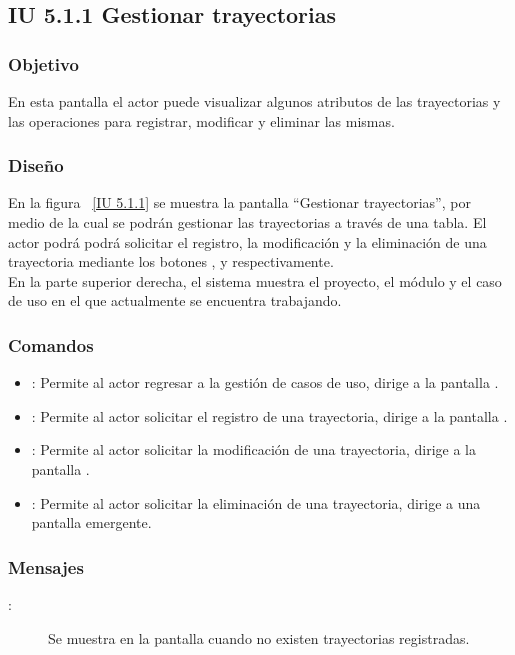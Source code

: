 \newpage 
\subsection{IU 5.1.1 Gestionar trayectorias}
\subsubsection{Objetivo}
	
	En esta pantalla el actor puede visualizar algunos atributos de las trayectorias y las operaciones para registrar, modificar y eliminar las mismas.

\subsubsection{Diseño}

    En la figura ~\ref{IU 5.1.1} se muestra la pantalla ``Gestionar trayectorias'', por medio de la cual 
    se podrán gestionar las trayectorias a través de una tabla.
    El actor podrá podrá solicitar el registro, la modificación y la eliminación de una trayectoria mediante los botones
    , \btnEditar y \btnEliminar respectivamente. \\
	
	En la parte superior derecha, el sistema muestra el proyecto, el módulo y el caso de uso en el que actualmente se encuentra trabajando.
	



\subsubsection{Comandos}
\begin{itemize}
	\item {}: Permite al actor regresar a la gestión de casos de uso, dirige a la pantalla .
	\item {}: Permite al actor solicitar el registro de una trayectoria, dirige a la pantalla .
	\item \btnEditar[Modificar]: Permite al actor solicitar la modificación de una trayectoria, dirige a la pantalla .
	\item \btnEliminar[Eliminar]: Permite al actor solicitar la eliminación de una trayectoria, dirige a una pantalla emergente.
\end{itemize}

\subsubsection{Mensajes}

	
\begin{description}
	\item[:] Se muestra en la pantalla  cuando no existen trayectorias registradas.
\end{description}
